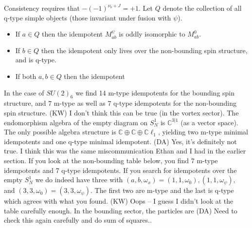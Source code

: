 \documentclass[12pt,a4paper]{article}
\newcommand{\cc}{\mathbb{C}}
\newcommand{\cl}{\mathbb{C}\ell}
\newcommand{\kw}[1]{{\color{kwcolor}\footnotesize{(KW) #1}}}
\newcommand{\dave}[1]{{\color{ao(english)}\footnotesize{(DA) #1}}}
\begin{document}
Consistency requires that $-(-1)^{\nu_b + J} = +1$.
Let $Q$ denote the collection of all q-type simple objects (those invariant under fusion with $\psi$). 
\begin{itemize}
\item If $a \in Q$ then the idempotent $M_{ab}^\psi$ is oddly isomorphic to $M_{ab}^0$.
\item If $b \in Q$ then the idempotent only lives over the non-bounding spin structure, and is q-type. 
\item If both $a,b \in Q$ then the idempotent 
\end{itemize}

In the case of $SU(2)_6$ we find 14 m-type idempotents for the bounding spin structure, 
and $7$ m-type as well as $7$ q-type idempotents for the non-bounding spin structure. 
\kw{I don't think this can be true (in the vortex sector).
The endomorphism algebra of the empty diagram on $S^1_N$ is $\cc^{3|1}$ (as a vector space).
The only possible algebra structure is $\cc\oplus\cc\oplus\cl_1$, yielding 
two m-type minimal idempotents and one q-type minimal idempotent.}
\dave{Yes, it's definitely not true. 
I think this was the same miscommunication Ethan and I had in the earlier section. 
If you look at the non-bounding table below, you find 7 m-type idempotents and 7 q-type idempotents. 
If you search for idempotents over the empty $S^1_N$ 
we do indeed have three with $(a,b, \omega_x) = (1,1,\omega_0), (1,1,\omega_\psi),$ and $(3,3, \omega_0) = (3,3,\omega_\psi)$. 
The first two are m-type and the last is q-type which agrees with what you found.}
\kw{Oops -- I guess I didn't look at the table carefully enough.}
In the bounding sector, the particles are
\dave{Need to check this again carefully and do sum of squares..}
\end{document}
